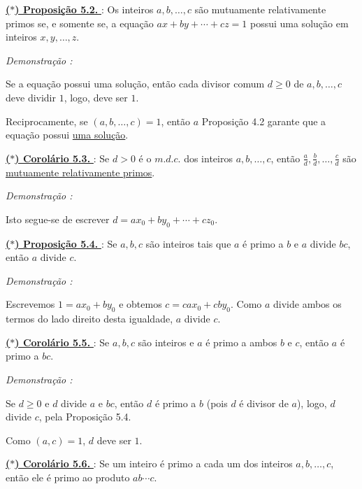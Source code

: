         \underline{\underline{ \textbf{\textcolor{cinzaEscuro}{($\ast$) Proposição 5.2.}} }} : Os inteiros $a, b, \ldots, c$ 
        são mutuamente relativamente primos se, e somente se, a equação $ax + by + \cdots + cz = 1$ possui 
        uma solução em inteiros $x, y, \ldots, z$.

        \textit{Demonstração : }

            Se a equação possui uma solução, então cada divisor comum $d \ge 0$ de $a, b, \ldots, c$ deve
            dividir $1$, logo, deve ser $1$.

            Reciprocamente, se $(a, b, \ldots , c) = 1$, então $a$ Proposição 4.2 
            garante que a equação possui \underline{uma solução}.

        \underline{\underline{ \textbf{\textcolor{cinzaEscuro}{($\ast$) Corolário 5.3.}} }} : Se $d > 0$ é o $m.d.c.$ dos inteiros 
        $a, b, \ldots, c$, então $\tfrac{a}{d}, \tfrac{b}{d}, \ldots, \tfrac{c}{d}$ 
        são \underline{mutuamente relativamente primos}.

        \textit{Demonstração : }

        Isto segue-se de escrever $d = ax_0 + by_0 + \cdots + cz_0$.

        \underline{\underline{ \textbf{\textcolor{cinzaEscuro}{($\ast$) Proposição 5.4.}} }} : Se $a, b, c$ são inteiros tais que $a$ é primo a $b$ e $a$ divide $bc$, então $a$ divide $c$.

        \textit{Demonstração : }

            Escrevemos $1 = ax_0 + by_0$ e obtemos $c = cax_0 + cby_0$.  
            Como $a$ divide ambos os termos do lado direito desta igualdade, $a$ divide $c$.

        \underline{\underline{ \textbf{\textcolor{cinzaEscuro}{($\ast$) Corolário 5.5.}} }} : Se $a, b, c$ são inteiros e $a$ é primo a ambos $b$ e $c$, então $a$ é primo a $bc$.

        \textit{Demonstração : }

            Se $d \ge 0$ e $d$ divide $a$ e $bc$, então $d$ é primo a $b$ (pois $d$ é divisor de $a$), 
            logo, $d$ divide $c$, pela Proposição 5.4.

            Como $(a, c) = 1$, $d$ deve ser $1$.

        \underline{\underline{ \textbf{\textcolor{cinzaEscuro}{($\ast$) Corolário 5.6.}} }} : Se um inteiro é primo a cada um dos inteiros $a, b, \ldots, c$, então ele é primo ao produto $ab \cdots c$.

